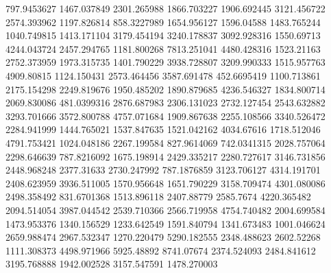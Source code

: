 797.9453627
1467.037849
2301.265988
1866.703227
1906.692445
3121.456722
2574.393962
1197.826814
858.3227989
1654.956127
1596.04588
1483.765244
1040.749815
1413.171104
3179.454194
3240.178837
3092.928316
1550.69713
4244.043724
2457.294765
1181.800268
7813.251041
4480.428316
1523.21163
2752.373959
1973.315735
1401.790229
3938.728807
3209.990333
1515.957763
4909.80815
1124.150431
2573.464456
3587.691478
452.6695419
1100.713861
2175.154298
2249.819676
1950.485202
1890.879685
4236.546327
1834.800714
2069.830086
481.0399316
2876.687983
2306.131023
2732.127454
2543.632882
3293.701666
3572.800788
4757.071684
1909.867638
2255.108566
3340.526472
2284.941999
1444.765021
1537.847635
1521.042162
4034.67616
1718.512046
4791.753421
1024.048186
2267.199584
827.9614069
742.0341315
2028.757064
2298.646639
787.8216092
1675.198914
2429.335217
2280.727617
3146.731856
2448.968248
2377.31633
2730.247992
787.1876859
3123.706127
4314.191701
2408.623959
3936.511005
1570.956648
1651.790229
3158.709474
4301.080086
2498.358492
831.6701368
1513.896118
2407.88779
2585.7674
4220.365482
2094.514054
3987.044542
2539.710366
2566.719958
4754.740482
2004.699584
1473.953376
1340.156529
1233.642549
1591.840794
1341.673483
1001.046624
2659.988474
2967.532347
1270.220479
5290.182555
2348.488623
2602.52268
1111.308373
4498.971966
5925.48892
8741.07674
2374.524093
2484.841612
3195.768888
1942.002528
3157.547591
1478.270003

